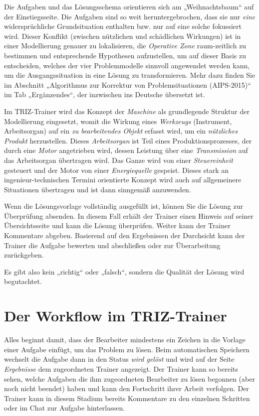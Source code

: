 \documentclass[11pt,a4paper]{article}
\begin{document}
Die Aufgaben und das Lösungsschema orientieren sich am „Weihnachtsbaum“ auf
der Einstiegsseite.  Die Aufgaben sind so weit heruntergebrochen, dass sie nur
\emph{eine} widersprüchliche Grundsituation enthalten bzw. nur auf eine solche
fokussiert wird.  Dieser Konflikt (zwischen nützlichen und schädlichen
Wirkungen) ist in einer Modellierung genauer zu lokalisieren, die
\emph{Operative Zone} raum-zeitlich zu bestimmen und entsprechende Hypothesen
aufzustellen, um auf dieser Basis zu entscheiden, welches der vier
Problemmodelle sinnvoll angewendet werden kann, um die Ausgangssituation in
eine Lösung zu transformieren.  Mehr dazu finden Sie im Abschnitt „Algorithmus
zur Korrektur von Problemsituationen (AIPS-2015)“ im Tab „Ergänzendes“, der
inzwischen ins Deutsche übersetzt ist.

Im TRIZ-Trainer wird das Konzept der \emph{Maschine} als grundlegende Struktur
der Modellierung eingesetzt, womit die Wirkung eines \emph{Werkzeugs}
(Instrument, Arbeitsorgan) auf ein \emph{zu bearbeitendes Objekt} erfasst
wird, um ein \emph{nützliches Produkt} herzustellen.  Dieses
\emph{Arbeitsorgan} ist Teil eines Produktionsprozesses, der durch eine
\emph{Motor} angetrieben wird, dessen Leistung über eine \emph{Transmission}
auf das Arbeitsorgan übertragen wird.  Das Ganze wird von einer
\emph{Steuereinheit} gesteuert und der Motor von einer \emph{Energiequelle}
gespeist.  Dieses stark an ingenieur-technischen Termini orientierte Konzept
wird auch auf allgemeinere Situationen übertragen und ist dann sinngemäß
anzuwenden.

Wenn die Lösungsvorlage vollständig ausgefüllt ist, können Sie die Lösung zur
Überprüfung absenden. In diesem Fall erhält der Trainer einen Hinweis auf
seiner Übersichtsseite und kann die Lösung überprüfen.  Weiter kann der
Trainer Kommentare abgeben. Basierend auf den Ergebnissen der Durchsicht kann
der Trainer die Aufgabe bewerten und abschließen oder zur Überarbeitung
zurückgeben.

Es gibt also kein „richtig“ oder „falsch“, sondern die Qualität der Lösung
wird begutachtet. 

\section{Der Workflow im TRIZ-Trainer}

Alles beginnt damit, dass der Bearbeiter mindestens ein Zeichen in die Vorlage
einer Aufgabe einfügt, um das Problem zu lösen. Beim automatischen Speichern
wechselt die Aufgabe dann in den Status \emph{wird gelöst} und wird auf der
Seite \emph{Ergebnisse} dem zugeordneten Trainer angezeigt. Der Trainer kann
so bereits sehen, welche Aufgaben die ihm zugeordneten Bearbeiter zu lösen
begonnen (aber noch nicht beendet) haben und kann den Fortschritt ihrer Arbeit
verfolgen. Der Trainer kann in diesem Stadium bereits Kommentare zu den
einzelnen Schritten oder im Chat zur Aufgabe hinterlassen.
\end{document}
